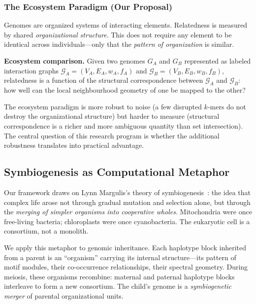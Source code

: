 \documentclass{../yalumba}
\begin{document}
\subsubsection{The Ecosystem Paradigm (Our Proposal)}

Genomes are organized systems of interacting elements.  Relatedness is
measured by shared \emph{organizational structure}.  This does not
require any element to be identical across individuals---only that the
\emph{pattern of organization} is similar.

\begin{definition}
\textbf{Ecosystem comparison.}  Given two genomes $G_A$ and $G_B$
represented as labeled interaction graphs $\mathcal{G}_A = (V_A, E_A,
w_A, f_A)$ and $\mathcal{G}_B = (V_B, E_B, w_B, f_B)$, relatedness
is a function of the structural correspondence between $\mathcal{G}_A$
and $\mathcal{G}_B$: how well can the local neighbourhood geometry of
one be mapped to the other?
\end{definition}

The ecosystem paradigm is more robust to noise (a few disrupted $k$-mers
do not destroy the organizational structure) but harder to measure
(structural correspondence is a richer and more ambiguous quantity than
set intersection).  The central question of this research program is
whether the additional robustness translates into practical advantage.

\subsection{Symbiogenesis as Computational Metaphor}
\label{sec:intro:symbiogenesis}

Our framework draws on Lynn Margulis's theory of
symbiogenesis~\cite{margulis1998}: the idea that complex life arose not
through gradual mutation and selection alone, but through the
\emph{merging of simpler organisms into cooperative wholes}.
Mitochondria were once free-living bacteria; chloroplasts were once
cyanobacteria.  The eukaryotic cell is a consortium, not a monolith.

We apply this metaphor to genomic inheritance.  Each haplotype block
inherited from a parent is an ``organism'' carrying its internal
structure---its pattern of motif modules, their co-occurrence
relationships, their spectral geometry.  During meiosis, these organisms
recombine: maternal and paternal haplotype blocks interleave to form
a new consortium.  The child's genome is a \emph{symbiogenetic merger} of
parental organizational units.
\end{document}
